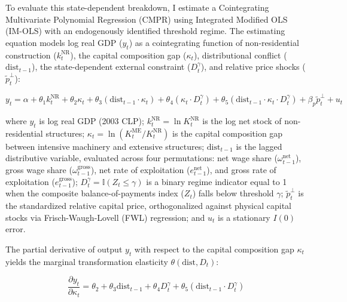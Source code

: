 To evaluate this state-dependent breakdown, I estimate a Cointegrating Multivariate Polynomial Regression (CMPR) using Integrated Modified OLS (IM-OLS) \citep{VogelsangWagner2024} with an endogenously identified threshold regime. The estimating equation models log real GDP ($y_t$) as a cointegrating function of non-residential construction ($k_t^{\text{NR}}$), the capital composition gap ($\kappa_t$), distributional conflict ($\text{dist}_{t-1}$), the state-dependent external constraint ($D_t^{\gamma}$), and relative price shocks ($\tilde{p}_t^\perp$):

\begin{equation}
	y_t = \alpha + \theta_1 k_t^{\text{NR}} + \theta_2 \kappa_t + \theta_3 (\text{dist}_{t-1} \cdot \kappa_t) + \theta_4 (\kappa_t \cdot D_t^{\gamma}) + \theta_5 (\text{dist}_{t-1} \cdot \kappa_t \cdot D_t^{\gamma}) + \beta_p \tilde{p}_t^\perp + u_t
\end{equation}

where $y_t$ is log real GDP (2003 CLP); $k_t^{\text{NR}} = \ln K_t^{\text{NR}}$ is the log net stock of non-residential structures; $\kappa_t = \ln(K_t^{\text{ME}} / K_t^{\text{NR}})$ is the capital composition gap between intensive machinery and extensive structures; $\text{dist}_{t-1}$ is the lagged distributive variable, evaluated across four permutations: net wage share ($\omega_{t-1}^{\text{net}}$), gross wage share ($\omega_{t-1}^{\text{gross}}$), net rate of exploitation ($e_{t-1}^{\text{net}}$), and gross rate of exploitation ($e_{t-1}^{\text{gross}}$); $D_t^{\gamma} = \mathbb{I}(Z_t \le \gamma)$ is a binary regime indicator equal to 1 when the composite balance-of-payments index ($Z_t$) falls below threshold $\gamma$; $\tilde{p}_t^\perp$ is the standardized relative capital price, orthogonalized against physical capital stocks via Frisch-Waugh-Lovell (FWL) regression; and $u_t$ is a stationary $I(0)$ error.

The partial derivative of output $y_t$ with respect to the capital composition gap $\kappa_t$ yields the marginal transformation elasticity $\theta(\text{dist}, D_t)$:

\begin{equation}
	\frac{\partial y_t}{\partial \kappa_t} = \theta_2 + \theta_3 \text{dist}_{t-1} + \theta_4 D_t^{\gamma} + \theta_5 (\text{dist}_{t-1} \cdot D_t^{\gamma})
\end{equation}


